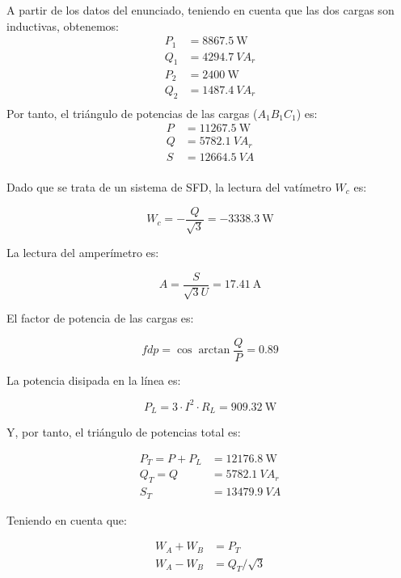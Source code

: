 A partir de los datos del enunciado, teniendo en cuenta que las dos
cargas son inductivas, obtenemos:
\begin{align*}
  P_1 &= \SI{8867.5}{\watt}\\
  Q_1 &= \SI{4294.7}{VA}_r\\
  P_2 &= \SI{2400}{\watt}\\
  Q_2 &= \SI{1487.4}{VA}_r\\
\end{align*}
Por tanto, el triángulo de potencias de las cargas ($A_1B_1C_1$) es:
\begin{align*}
  P &= \SI{11267.5}{\watt}\\
  Q &= \SI{5782.1}{VA}_r\\
  S &= \SI{12664.5}{VA}\\
\end{align*}

Dado que se trata de un sistema de SFD, la lectura del vatímetro $W_c$
es:

\begin{equation*}
  W_c = - \frac{Q}{\sqrt{3}} = \SI{-3338.3}{\watt}
\end{equation*}

La lectura del amperímetro es:

\begin{equation*}
  A = \frac{S}{\sqrt{3} U} = \SI{17.41}{\ampere}
\end{equation*}

El factor de potencia de las cargas es:

\begin{equation*}
  fdp = \cos{\arctan{\frac{Q}{P}}} = 0.89
\end{equation*}

La potencia disipada en la línea es:

\begin{equation*}
  P_L = 3 \cdot I^2 \cdot R_L = \SI{909.32}{\watt}
\end{equation*}

Y, por tanto, el triángulo de potencias total es:

\begin{align*}
  P_T = P + P_L &= \SI{12176.8}{\watt}\\
  Q_T = Q &= \SI{5782.1}{VA}_r\\
  S_T &= \SI{13479.9}{VA}
\end{align*}

Teniendo en cuenta que:

\begin{align*}
  W_A + W_B &= P_T\\
  W_A - W_B &= Q_T / \sqrt{3}
\end{align*}

